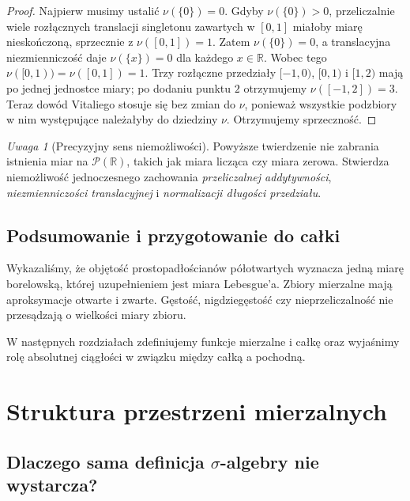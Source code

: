 \documentclass[11pt,a4paper,oneside]{book}
\numberwithin{equation}{chapter}
\theoremstyle{plain}
\theoremstyle{definition}
\theoremstyle{remark}
\newtheorem{uwaga}[twierdzenie]{Uwaga}
\begin{document}
\begin{proof}
Najpierw musimy ustalić $\nu(\{0\})=0$.
Gdyby $\nu(\{0\})>0$, przeliczalnie wiele
rozłącznych translacji singletonu zawartych w $[0,1]$
miałoby miarę nieskończoną, sprzecznie z
$\nu([0,1])=1$. Zatem $\nu(\{0\})=0$,
a translacyjna niezmienniczość daje
$\nu(\{x\})=0$ dla każdego $x\in\mathbb R$.
Wobec tego $\nu([0,1))=\nu([0,1])=1$.
Trzy rozłączne przedziały $[-1,0)$, $[0,1)$
i $[1,2)$ mają po jednej jednostce miary;
po dodaniu punktu $2$ otrzymujemy
$\nu([-1,2])=3$. Teraz dowód Vitaliego stosuje się
bez zmian do $\nu$, ponieważ wszystkie podzbiory
w nim występujące należałyby do dziedziny $\nu$.
Otrzymujemy sprzeczność.
\end{proof}

\begin{uwaga}[Precyzyjny sens niemożliwości]
Powyższe twierdzenie nie zabrania istnienia miar na
$\mathcal P(\mathbb R)$, takich jak miara licząca
czy miara zerowa. Stwierdza niemożliwość jednoczesnego
zachowania \emph{przeliczalnej addytywności},
\emph{niezmienniczości translacyjnej} i
\emph{normalizacji długości przedziału}.
\end{uwaga}

\section{Podsumowanie i przygotowanie do całki}

Wykazaliśmy, że objętość prostopadłościanów
półotwartych wyznacza jedną miarę borelowską,
której uzupełnieniem jest miara Lebesgue'a. Zbiory
mierzalne mają aproksymacje otwarte i zwarte.
Gęstość, nigdziegęstość czy nieprzeliczalność
nie przesądzają o wielkości miary zbioru.

W następnych rozdziałach zdefiniujemy funkcje
mierzalne i całkę oraz wyjaśnimy rolę absolutnej
ciągłości w związku między całką a pochodną.



\chapter{Struktura przestrzeni mierzalnych}
\label{ch:struktura-przestrzeni}

\section{Dlaczego sama definicja \texorpdfstring{$\sigma$}{sigma}-algebry nie wystarcza?}
\end{document}
